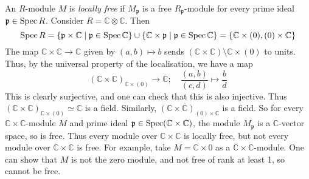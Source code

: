 \begin{example}
    An \( R \)-module \( M \) is \emph{locally free} if \( M_{\mathfrak p} \) is a free \( R_{\mathfrak p} \)-module for every prime ideal \( \mathfrak p \in \operatorname{Spec} R \).
    Consider \( R = \mathbb C \otimes \mathbb C \).
    Then
    \[ \operatorname{Spec} R = \qty{\mathfrak p \times \mathbb C \mid \mathfrak p \in \operatorname{Spec}\mathbb C} \cup \qty{\mathbb C \times \mathfrak p \mid \mathfrak p \in \operatorname{Spec}\mathbb C} = \qty{\mathbb C \times (0), (0) \times \mathbb C} \]
    The map \( \mathbb C \times \mathbb C \to \mathbb C \) given by \( (a, b) \mapsto b \) sends \( (\mathbb C \times \mathbb C) \setminus \mathbb C \times (0) \) to units.
    Thus, by the universal property of the localisation, we have a map
    \[ (\mathbb C \times \mathbb C)_{\mathbb C \times (0)} \to \mathbb C;\quad \frac{(a, b)}{(c, d)} \mapsto \frac{b}{d} \]
    This is clearly surjective, and one can check that this is also injective.
    Thus \( (\mathbb C \times \mathbb C)_{\mathbb C \times (0)} \simeq \mathbb C \) is a field.
    Similarly, \( (\mathbb C \times \mathbb C)_{(0) \times \mathbb C} \) is a field.
    So for every \( \mathbb C \times \mathbb C \)-module \( M \) and prime ideal \( \mathfrak p \in \operatorname{Spec} (\mathbb C \times \mathbb C) \), the module \( M_{\mathfrak p} \) is a \( \mathbb C \)-vector space, so is free.
    Thus every module over \( \mathbb C \times \mathbb C \) is locally free, but not every module over \( \mathbb C \times \mathbb C \) is free.
    For example, take \( M = \mathbb C \times \qty{0} \) as a \( \mathbb C \times \mathbb C \)-module.
    One can show that \( M \) is not the zero module, and not free of rank at least 1, so cannot be free.
\end{example}

